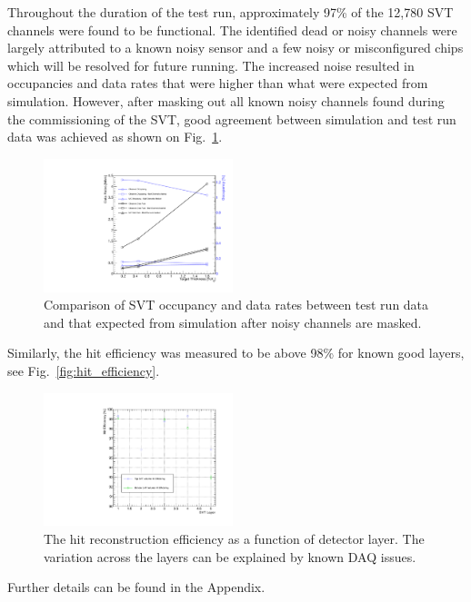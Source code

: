 Throughout the duration of the test run, approximately 97\% of the 12,780 SVT 
channels were found to be functional.
The identified dead or noisy channels were largely attributed to a 
known noisy sensor and a few noisy or misconfigured chips which will be resolved for future running. The 
increased noise resulted in occupancies and data rates that were higher than what were expected from simulation.
However, after masking out all known noisy channels found during the commissioning of the SVT, good agreement 
between simulation and test run data was achieved as shown on Fig.~\ref{fig:data_rates_data_mc_cmp}.
\begin{figure}[h]
    \includegraphics[width=0.49\textwidth]{test2012/svtperformance/daq/data_rates.pdf}
        \caption{ { \small
                    Comparison of SVT occupancy and data rates between test run data and that expected from simulation after noisy channels are masked.
                } }
	\label{fig:data_rates_data_mc_cmp}
\end{figure}
Similarly, the hit efficiency was measured to be above 98\% for known good layers, see Fig.~\ref{fig:hit_efficiency}.
\begin{figure}[h]
    	\includegraphics[width=0.49\textwidth]{test2012/svtperformance/trk_performance/hit_efficiency_vs_layer.pdf}
        \caption{{\small The hit reconstruction efficiency as a function of detector layer. The variation across the layers can be explained by known DAQ issues.}} 
	\label{fig:hit_track_efficiency}
\end{figure}
Further details can be found in the Appendix. 
